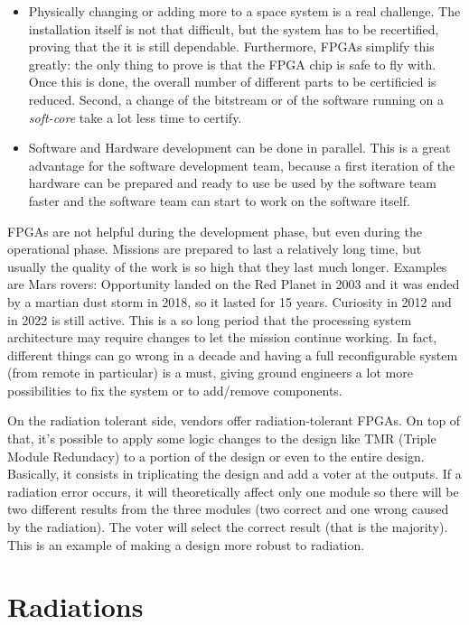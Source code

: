 \begin{itemize}
    \item Physically changing or adding more to a space system is a real challenge. The installation itself is not that difficult, but the system has to be recertified, proving that the it is still dependable. Furthermore, FPGAs simplify this greatly: the only thing to prove is that the FPGA chip is safe to fly with. Once this is done, the overall number of different parts to be certificied is reduced. Second, a change of the bitstream or of the software running on a \textit{soft-core} take a lot less time to certify.
    \item Software and Hardware development can be done in parallel. This is a great advantage for the software development team, because a first iteration of the hardware can be prepared and ready to use be used by the software team faster and the software team can start to work on the software itself.
\end{itemize}

FPGAs are not helpful during the development phase, but even during the operational phase. Missions are prepared to last a relatively long time, but usually the quality of the work is so high that they last much longer. Examples are Mars rovers: Opportunity landed on the Red Planet in 2003 and it was ended by a martian dust storm in 2018, so it lasted for 15 years. Curiosity in 2012 and in 2022 is still active. This is a so long period that the processing system architecture may require changes to let the mission continue working. In fact, different things can go wrong in a decade and having a full reconfigurable system (from remote in particular) is a must, giving ground engineers a lot more possibilities to fix the system or to add/remove components. \bigskip

On the radiation tolerant side, vendors offer radiation-tolerant FPGAs. On top of that, it's possible to apply some logic changes to the design like TMR (Triple Module Redundacy) to a portion of the design or even to the entire design. Basically, it consists in triplicating the design and add a voter at the outputs. If a radiation error occurs, it will theoretically affect only one module so there will be two different results from the three modules (two correct and one wrong caused by the radiation). The voter will select the correct result (that is the majority). This is an example of making a design more robust to radiation.\bigskip

\section{Radiations}